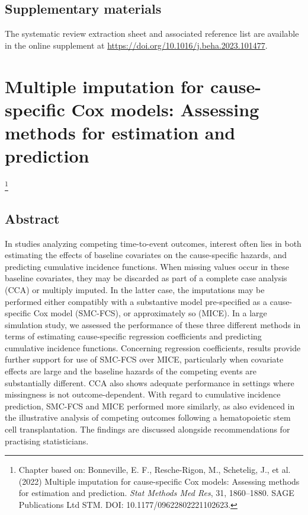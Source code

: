 \documentclass[
  letterpaper,
  paper=240mm:170mm,
  twoside=true,
  open=right,
  fontsize=10pt,
  pagesize=false,
  BCOR=15mm,
  DIV=14,
  headinclude=true,
  footinclude=false,
  headsepline=on]{scrbook}
\newcommand\blfootnote[1]{%
  \begingroup
  \renewcommand\thefootnote{}\footnote{#1}%
  \addtocounter{footnote}{-1}%
  \endgroup
}
\begin{document}
\section*{Supplementary materials}\label{supplementary-materials}


The systematic review extraction sheet and associated reference list are
available in the online supplement at
\url{https://doi.org/10.1016/j.beha.2023.101477}.


\chapter{Multiple imputation for cause-specific Cox models: Assessing
methods for estimation and prediction}\label{sec-chap-CS-MI}


\blfootnote{Chapter based on: Bonneville, E. F., Resche-Rigon, M., Schetelig, J., et al. (2022) Multiple imputation for cause-specific Cox models: Assessing methods for estimation and prediction. \textit{Stat Methods Med Res}, 31, 1860–1880. SAGE Publications Ltd STM. DOI: 10.1177/09622802221102623.}

\clearpage

\section*{Abstract}\label{abstract-1}


In studies analyzing competing time-to-event outcomes, interest often
lies in both estimating the effects of baseline covariates on the
cause-specific hazards, and predicting cumulative incidence functions.
When missing values occur in these baseline covariates, they may be
discarded as part of a complete case analysis (CCA) or multiply imputed.
In the latter case, the imputations may be performed either compatibly
with a substantive model pre-specified as a cause-specific Cox model
(SMC-FCS), or approximately so (MICE). In a large simulation study, we
assessed the performance of these three different methods in terms of
estimating cause-specific regression coefficients and predicting
cumulative incidence functions. Concerning regression coefficients,
results provide further support for use of SMC-FCS over MICE,
particularly when covariate effects are large and the baseline hazards
of the competing events are substantially different. CCA also shows
adequate performance in settings where missingness is not
outcome-dependent. With regard to cumulative incidence prediction,
SMC-FCS and MICE performed more similarly, as also evidenced in the
illustrative analysis of competing outcomes following a hematopoietic
stem cell transplantation. The findings are discussed alongside
recommendations for practising statisticians.
\end{document}
